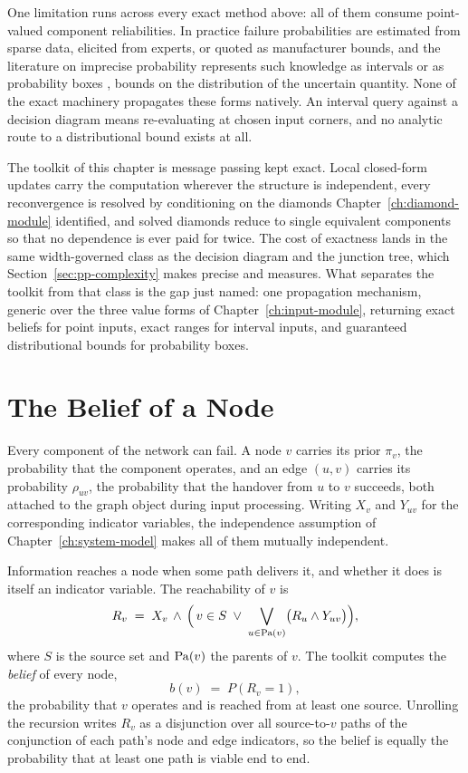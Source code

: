 \documentclass[12pt]{report}
\begin{document}
One limitation runs across every exact method above: all of them consume point-valued component reliabilities. In practice failure probabilities are estimated from sparse data, elicited from experts, or quoted as manufacturer bounds, and the literature on imprecise probability represents such knowledge as intervals or as probability boxes \cite{ferson2003constructing,williamson1990probabilistic}, bounds on the distribution of the uncertain quantity. None of the exact machinery propagates these forms natively. An interval query against a decision diagram means re-evaluating at chosen input corners, and no analytic route to a distributional bound exists at all.

The toolkit of this chapter is message passing kept exact. Local closed-form updates carry the computation wherever the structure is independent, every reconvergence is resolved by conditioning on the diamonds Chapter~\ref{ch:diamond-module} identified, and solved diamonds reduce to single equivalent components so that no dependence is ever paid for twice. The cost of exactness lands in the same width-governed class as the decision diagram and the junction tree, which Section~\ref{sec:pp-complexity} makes precise and measures. What separates the toolkit from that class is the gap just named: one propagation mechanism, generic over the three value forms of Chapter~\ref{ch:input-module}, returning exact beliefs for point inputs, exact ranges for interval inputs, and guaranteed distributional bounds for probability boxes.

\section{The Belief of a Node}
\label{sec:pp-belief}

Every component of the network can fail. A node $v$ carries its prior $\pi_v$, the probability that the component operates, and an edge $(u,v)$ carries its probability $\rho_{uv}$, the probability that the handover from $u$ to $v$ succeeds, both attached to the graph object during input processing. Writing $X_v$ and $Y_{uv}$ for the corresponding indicator variables, the independence assumption of Chapter~\ref{ch:system-model} makes all of them mutually independent.

Information reaches a node when some path delivers it, and whether it does is itself an indicator variable. The reachability of $v$ is
\begin{equation}
\label{eq:pp-indicator}
R_v \;=\; X_v \,\wedge\, \Bigl(\, v \in S \;\vee\; \bigvee_{u \in \mathrm{Pa}(v)} \bigl( R_u \wedge Y_{uv} \bigr) \Bigr),
\end{equation}
where $S$ is the source set and $\mathrm{Pa}(v)$ the parents of $v$. The toolkit computes the \emph{belief} of every node,
\begin{equation}
\label{eq:pp-belief}
b(v) \;=\; P(R_v = 1),
\end{equation}
the probability that $v$ operates and is reached from at least one source. Unrolling the recursion writes $R_v$ as a disjunction over all source-to-$v$ paths of the conjunction of each path's node and edge indicators, so the belief is equally the probability that at least one path is viable end to end.
\end{document}
